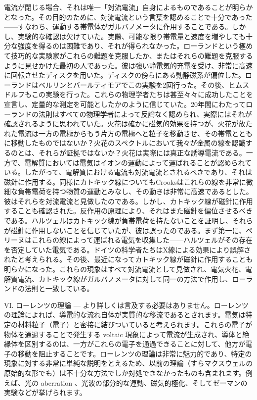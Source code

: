 \documentclass[a4paper,11pt,openany]{ltjsbook}
\begin{document}
電流が閉じる場合、それは唯一「対流電流」自身によるものであることが明らかとなった。その目的のために、対流電流という言葉を認めることで十分であった——すなわち、運動する帯電体がガルバノメータに作用することである。しかし、実験的な確認は欠けていた。実際、可能な限り帯電量と速度を増やしても十分な強度を得るのは困難であり、それが得られなかった。ローランドという極めて技巧的な実験家がこれらの難題を克服したか、またはそれらの難題を克服するように見せかけた最初の人であった。彼は強い静電気的充電を受け、非常に高速に回転させたディスクを用いた。ディスクの傍らにある動静磁系が偏位した。ローランドはベルリンとバールティモアでこの実験を2回行った。その後、ヒムスドルフもこの実験を行った。これらの物理学者たちは甚至々々に成功したことを宣言し、定量的な測定を可能としたかのように信じていた。20年間にわたってローランドの法則はすべての物理学者によって反論なく認められ、実際にはそれが確認されるように思われていた。火花は確かに磁気的効果を持つが、火花が放たれた電流は一方の電極からもう片方の電極へと粒子を移動させ、その帯電とともに移動したものではないか？火花のスペクトルにおいて我々が金属の線を認識するのとは、それらが証拠ではないか？火花は実際には真正な誘導電流である。一方で、電解質においては電気はイオンの運動によって運ばれることが認められている。したがって、電解質における電流も対流電流とされるべきであり、それは磁針に作用する。同様にカトキック線についてもCrooksはこれらの線を非常に微細な負帯電荷を持つ物質の運動とみなし、その動きは非常に高速であるとした。彼はそれらを対流電流と見做したのである。しかし、カトキック線が磁針に作用することも確認された。反作用の原理により、それはまた磁針を偏位させるべきである。ハルツェルはカトキック線が負帯電荷を持たないことを証明し、それらが磁針に作用しないことを信じていたが、彼は誤ったのである。まず第一に、ペリーヌはこれらの線によって運ばれる電気を収集した——ハルツェルがその存在を否定していた電気である。ドイツの科学者たちはX線による効果により誤解されたと考えられる。その後、最近になってカトキック線が磁針に作用することも明らかになった。これらの現象はすべて対流電流として見做され、電気火花、電解質電流、カトキック線がガルバノメータに対して同一の方法で作用し、ローランドの法則と一致している。

VI. ローレンツの理論 — より詳しくは言及する必要はありません。ローレンツの理論によれば、導電的な流れ自体が実質的な移流であるとされます。電気は特定の材料粒子（電子）と密接に結びついていると考えられます。これらの電子が物体を通過することで発生する voltaic 現象によって電流が生成され、導体と絶縁体を区別するのは、一方がこれらの電子を通過できることに対して、他方が電子の移動を阻止することです。ローレンツの理論は非常に魅力的であり、特定の現象に対する非常に単純な説明をとえるため、以前の理論（すらマクスウェルの原始的な形でも）は不十分な方法でしか対処できなかったものも含まれます。例えば、光の aberration 、光波の部分的な運動、磁気的極化、そしてゼーマンの実験などが挙げられます。
\end{document}
